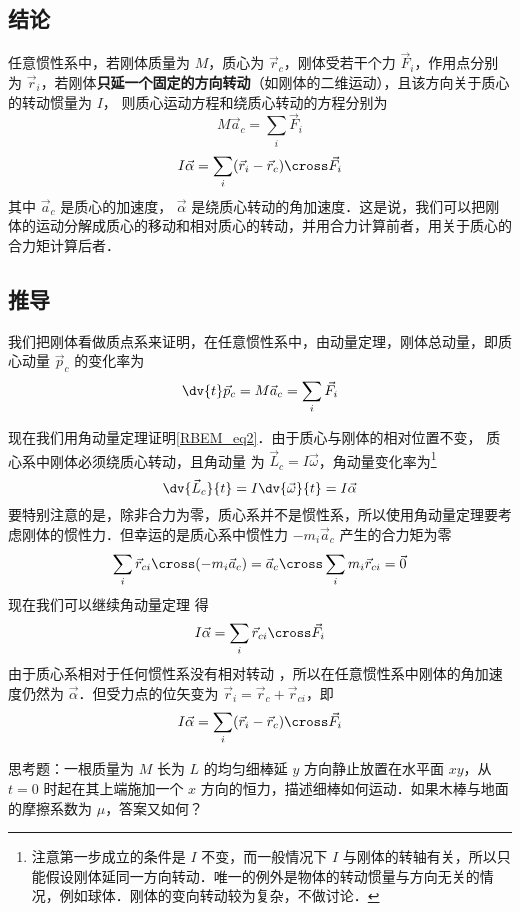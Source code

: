 

\subsection{结论}
任意惯性系中，若刚体质量为 $M$，质心为 $\vec r_c$，刚体受若干个力 $\vec F_i$，作用点分别为 $\vec r_i$，若刚体\textbf{只延一个固定的方向转动}（如刚体的二维运动），且该方向关于质心的转动惯量为 $I$， 则质心运动方程和绕质心转动的方程分别为
\begin{equation}\label{RBEM_eq1}
M\vec a_c = \sum_i \vec F_i
\end{equation}
\begin{equation}\label{RBEM_eq2}
I \vec \alpha = \sum_i (\vec r_i-\vec r_c) \cross  \vec F_i
\end{equation}
其中 $\vec a_c$ 是质心的加速度， $\vec \alpha$ 是绕质心转动的角加速度．这是说，我们可以把刚体的运动分解成质心的移动和相对质心的转动，并用合力计算前者，用关于质心的合力矩计算后者．

\subsection{推导}
我们把刚体看做质点系来证明，在任意惯性系中，由动量定理，刚体总动量，即质心动量 $\vec p_c$ 的变化率为
\begin{equation}
\dv{t} \vec p_c = M \vec a_c = \sum_i \vec F_i
\end{equation}

现在我们用角动量定理证明\autoref{RBEM_eq2}．由于质心与刚体的相对位置不变，%
质心系中刚体必须绕质心转动，且角动量%
为 $\vec L_c = I \vec\omega$，角动量变化率为\footnote{注意第一步成立的条件是 $I$ 不变，而一般情况下 $I$ 与刚体的转轴有关，所以只能假设刚体延同一方向转动．唯一的例外是物体的转动惯量与方向无关的情况，例如球体．刚体的变向转动较为复杂，不做讨论．}
\begin{equation}
\dv{\vec L_c}{t} = I \dv{\vec \omega}{t} = I \vec\alpha
\end{equation}
要特别注意的是，除非合力为零，质心系并不是惯性系，所以使用角动量定理要考虑刚体的惯性力．但幸运的是质心系中惯性力%
 $-m_i \vec a_c$ 产生的合力矩为零%
\begin{equation}
\sum_i \vec r_{ci}\cross (-m_i \vec a_{c}) = \vec a_{c} \cross \sum_i m_i \vec r_{ci} = \vec 0
\end{equation}
现在我们可以继续角动量定理 得
\begin{equation}
I \vec\alpha = \sum_i \vec r_{ci} \cross  \vec F_i
\end{equation}
由于质心系相对于任何惯性系没有相对转动%
，所以在任意惯性系中刚体的角加速度仍然为 $\vec\alpha$．但受力点的位矢变为 $\vec r_i = \vec r_c + \vec r_{ci}$，即
\begin{equation}\label{RBEM_eq7}
I \vec \alpha = \sum_i (\vec r_i-\vec r_c) \cross  \vec F_i
\end{equation}


思考题：一根质量为 $M$ 长为 $L$ 的均匀细棒延 $y$ 方向静止放置在水平面 $xy$，从 $t=0$ 时起在其上端施加一个 $x$ 方向的恒力，描述细棒如何运动．如果木棒与地面的摩擦系数为 $\mu$，答案又如何？

